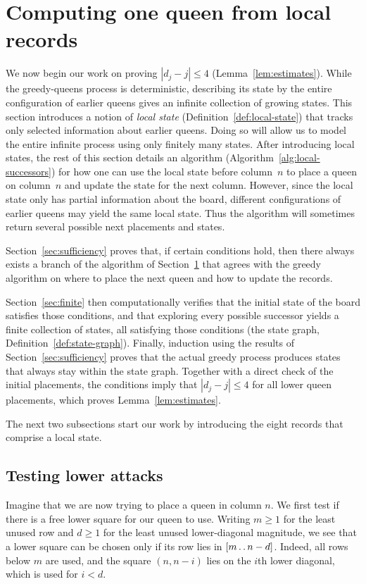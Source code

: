 \section{Computing one queen from local records}\label{sec:local}

We now begin our work on proving $|d_j-j|\le4$ 
(Lemma~\ref{lem:estimates}). 
While the greedy-queens process is deterministic, describing its state 
by the entire configuration of earlier queens gives an infinite 
collection of growing states.
This section introduces a notion of \emph{local state} (Definition~\ref{def:local-state}) 
that tracks only selected information about earlier queens. 
Doing so will allow us to model the entire infinite process using only 
finitely many states. After introducing local states, the rest of this
section details an algorithm (Algorithm~\ref{alg:local-successors}) for how one can use the local state before
column~$n$ to place a queen on column~$n$ and update the state for the
next column. However, since the local state only has partial information
about the board, different configurations of earlier queens may yield the
same local state. Thus the algorithm will sometimes return several possible
next placements and states.

Section~\ref{sec:sufficiency} proves that, if certain conditions hold, then there always 
exists a branch of the algorithm of Section~\ref{sec:local} that agrees with the 
greedy algorithm on where to place the next queen and how to update 
the records.

Section~\ref{sec:finite} then computationally verifies that the initial state of 
the board satisfies those conditions, and that exploring every 
possible successor yields a finite collection of states, all 
satisfying those conditions (the state graph, Definition~\ref{def:state-graph}).
Finally, induction using the results of Section~\ref{sec:sufficiency} proves that
the actual greedy process produces states that always stay
within the state graph.
Together with a direct check of the initial placements,
the conditions imply that $|d_j-j|\le4$ for all lower queen
placements, which proves Lemma~\ref{lem:estimates}.

The next two subsections start our work by introducing the eight
records that comprise a local state. 



\subsection{Testing lower attacks}\label{sec:local-rank}
Imagine that we are now trying to place a queen in column $n$.
We first test if there is a free lower square for our queen to use.
Writing $m\ge1$ for the least unused row and $d\ge1$ for the least 
unused lower-diagonal magnitude, we see that a lower square can
be chosen only if its row lies in $[m\mathinner{\ldotp\ldotp} n-d]$.
Indeed, all rows below $m$ are used, and the square $(n, n-i)$ lies on 
the $i$th lower diagonal, which is used for $i<d$.
 
